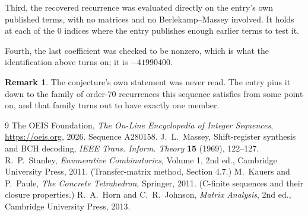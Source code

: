 \documentclass[11pt,a4paper]{article}
\theoremstyle{plain}
\theoremstyle{definition}
\newtheorem{remark}[theorem]{Remark}
\begin{document}
Third, the recovered recurrence was evaluated directly on the entry's own published terms, with
no matrices and no Berlekamp--Massey involved. It holds at each of the $0$ indices where
the entry publishes enough earlier terms to test it.

Fourth, the last coefficient was checked to be nonzero, which is what the identification above
turns on; it is $-41990400$.

\begin{remark}
The conjecture's own statement was never read. The entry pins it down to the family of
order-$70$ recurrences this sequence satisfies from some point on, and that family turns
out to have exactly one member.
\end{remark}

\begin{thebibliography}{9}
 The OEIS Foundation, \emph{The On-Line Encyclopedia of Integer
Sequences}, \url{https://oeis.org}, 2026. Sequence A280158.
 J.~L.~Massey, Shift-register synthesis and BCH decoding, \emph{IEEE
Trans. Inform. Theory} \textbf{15} (1969), 122--127.
 R.~P.~Stanley, \emph{Enumerative Combinatorics}, Volume 1, 2nd ed.,
Cambridge University Press, 2011. (Transfer-matrix method, Section 4.7.)
 M.~Kauers and P.~Paule, \emph{The Concrete Tetrahedron}, Springer, 2011.
(C-finite sequences and their closure properties.)
 R.~A.~Horn and C.~R.~Johnson, \emph{Matrix Analysis}, 2nd ed., Cambridge
University Press, 2013.
\end{thebibliography}
\end{document}
